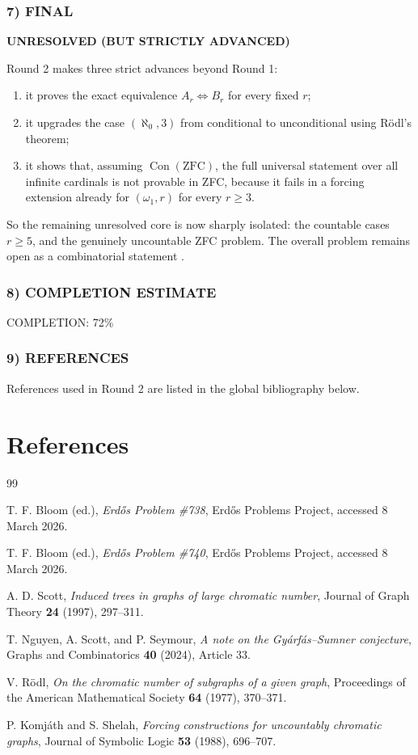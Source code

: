\subsubsection*{7) FINAL}
\textbf{UNRESOLVED (BUT STRICTLY ADVANCED)}

Round 2 makes three strict advances beyond Round 1:

\begin{enumerate}
\item it proves the exact equivalence $A_r\Longleftrightarrow B_r$ for every fixed $r$;
\item it upgrades the case $(\aleph_0,3)$ from conditional to unconditional using Rödl's theorem;
\item it shows that, assuming $\operatorname{Con}(\mathrm{ZFC})$, the full universal statement over all infinite cardinals is not provable in ZFC, because it fails in a forcing extension already for $(\omega_1,r)$ for every $r\ge 3$.
\end{enumerate}

So the remaining unresolved core is now sharply isolated: the countable cases $r\ge 5$, and the genuinely uncountable ZFC problem. The overall problem remains open as a combinatorial statement \cite{Bloom740}.

\subsubsection*{8) COMPLETION ESTIMATE}
COMPLETION: 72\%

\subsubsection*{9) REFERENCES}
References used in Round 2 are listed in the global bibliography below.


\section{References}
\begin{thebibliography}{99}

T. F. Bloom (ed.), \emph{Erd\H{o}s Problem \#738}, Erd\H{o}s Problems Project, accessed 8 March 2026.

T. F. Bloom (ed.), \emph{Erd\H{o}s Problem \#740}, Erd\H{o}s Problems Project, accessed 8 March 2026.

A. D. Scott, \emph{Induced trees in graphs of large chromatic number}, Journal of Graph Theory \textbf{24} (1997), 297--311.

T. Nguyen, A. Scott, and P. Seymour, \emph{A note on the Gy\'{a}rf\'{a}s--Sumner conjecture}, Graphs and Combinatorics \textbf{40} (2024), Article 33.

V. R\"{o}dl, \emph{On the chromatic number of subgraphs of a given graph}, Proceedings of the American Mathematical Society \textbf{64} (1977), 370--371.

P. Komj\'{a}th and S. Shelah, \emph{Forcing constructions for uncountably chromatic graphs}, Journal of Symbolic Logic \textbf{53} (1988), 696--707.

\end{thebibliography}
